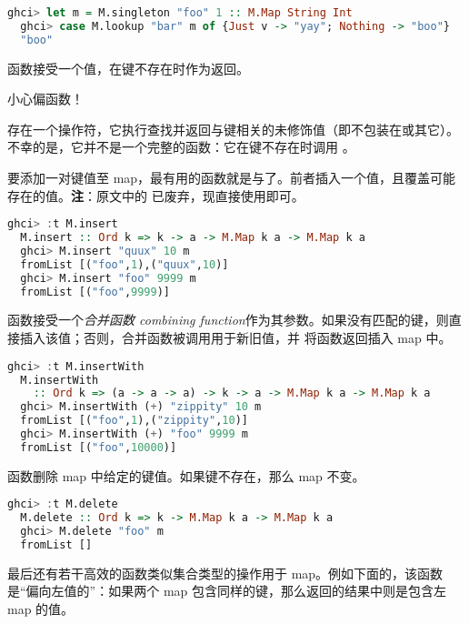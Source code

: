 \documentclass[./main.tex]{subfiles}
\begin{document}
\begin{lstlisting}[language=Haskell]
  ghci> let m = M.singleton "foo" 1 :: M.Map String Int
  ghci> case M.lookup "bar" m of {Just v -> "yay"; Nothing -> "boo"}
  "boo"
\end{lstlisting}

函数接受一个值，在键不存在时作为返回。

\begin{awarn}
  小心偏函数！

  存在一个\acode{(!)}操作符，它执行查找并返回与键相关的未修饰值（即不包装在或其它）。不幸的是，它并不是一个完整的函数：它在键不存在时调用
  。
\end{awarn}

要添加一对键值至 map，最有用的函数就是与了。前者插入一个值，且覆盖可能存在的值。\textbf{注}：原文中的
已废弃，现直接使用即可。

\begin{lstlisting}[language=Haskell]
  ghci> :t M.insert
  M.insert :: Ord k => k -> a -> M.Map k a -> M.Map k a
  ghci> M.insert "quux" 10 m
  fromList [("foo",1),("quux",10)]
  ghci> M.insert "foo" 9999 m
  fromList [("foo",9999)]
\end{lstlisting}

函数接受一个\textit{合并函数 combining function}作为其参数。如果没有匹配的键，则直接插入该值；否则，合并函数被调用用于新旧值，并
将函数返回插入 map 中。

\begin{lstlisting}[language=Haskell]
  ghci> :t M.insertWith
  M.insertWith
    :: Ord k => (a -> a -> a) -> k -> a -> M.Map k a -> M.Map k a
  ghci> M.insertWith (+) "zippity" 10 m
  fromList [("foo",1),("zippity",10)]
  ghci> M.insertWith (+) "foo" 9999 m
  fromList [("foo",10000)]
\end{lstlisting}

函数删除 map 中给定的键值。如果键不存在，那么 map 不变。

\begin{lstlisting}[language=Haskell]
  ghci> :t M.delete
  M.delete :: Ord k => k -> M.Map k a -> M.Map k a
  ghci> M.delete "foo" m
  fromList []
\end{lstlisting}

最后还有若干高效的函数类似集合类型的操作用于 map。例如下面的，该函数是“偏向左值的”：如果两个 map 包含同样的键，那么返回的结果中则是包含左
map 的值。
\end{document}

